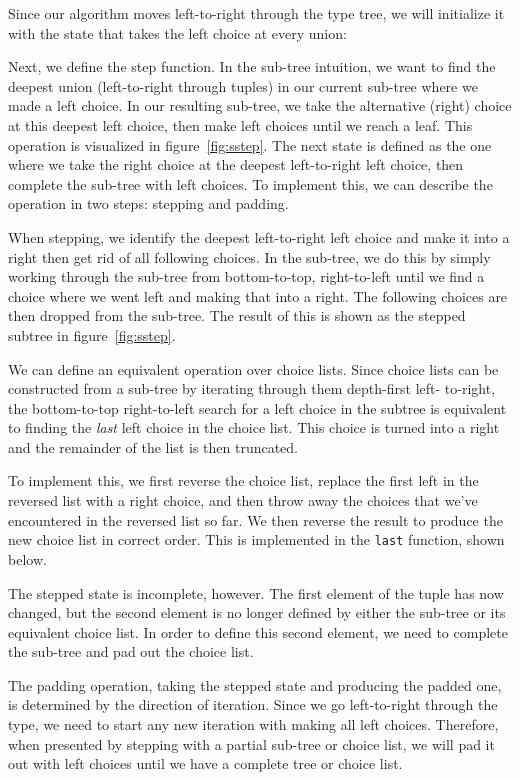 \documentclass[a4paper,english]{lipics-v2019}
\begin{document}
Since our algorithm moves left-to-right through the type tree, we will
initialize it with the state that takes the left choice at every union:


Next, we define the step function. In the sub-tree intuition, we want to find
the deepest union (left-to-right through tuples) in our current sub-tree where
we made a left choice. In our resulting sub-tree, we take the alternative
(right) choice at this deepest left choice, then make left choices until we
reach a leaf. This operation is visualized in figure~\ref{fig:sstep}. The next
state is defined as the one where we take the right choice at the deepest left-to-right
left choice, then complete the sub-tree with left choices. To implement this,
we can describe the operation in two steps: stepping and padding.

When stepping, we identify the deepest left-to-right left choice and make it
into a right then get rid of all following choices. In the sub-tree, we do
this by simply working through the sub-tree from bottom-to-top, right-to-left
until we find a choice where we went left and making that into a right. The
following choices are then dropped from the sub-tree. The result of this is
shown as the stepped subtree in figure~\ref{fig:sstep}.

We can define an equivalent operation over choice lists. Since choice lists
can be constructed from a sub-tree by iterating through them depth-first left-
to-right, the bottom-to-top right-to-left search for a left choice in the
subtree is equivalent to finding the \emph{last} left choice in the choice
list. This choice is turned into a right and the remainder of the list is then
truncated.

To implement this, we first reverse the choice list, replace the first left
in the reversed list with a right choice, and then throw away the choices that
we've encountered in the reversed list so far. We then reverse the result to
produce the new choice list in correct order. This is implemented in the
\verb|last| function, shown below.



The stepped state is incomplete, however. The first element of the tuple has
now changed, but the second element is no longer defined by either the
sub-tree or its equivalent choice list. In order to define this second
element, we need to complete the sub-tree and pad out the choice list.

The padding operation, taking the stepped state and producing the padded one, is determined
by the direction of iteration. Since we go left-to-right through the type, we need to start
any new iteration with making all left choices. Therefore, when presented by stepping with
a partial sub-tree or choice list, we will pad it out with left choices until we have a complete
tree or choice list.
\end{document}
